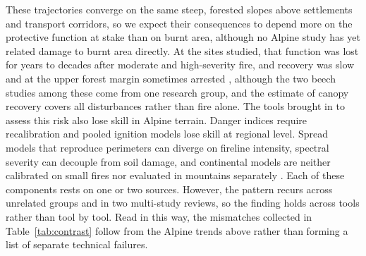 \documentclass[11pt,a4paper]{article}
\begin{document}
These trajectories converge on the same steep, forested slopes above settlements and transport corridors, so we expect their consequences to depend more on the protective function at stake than on burnt area, although no Alpine study has yet related damage to burnt area directly. At the sites studied, that function was lost for years to decades after moderate and high-severity fire, and recovery was slow and at the upper forest margin sometimes arrested \citep{maringer_temporal_2016, gehring_shallow_2019, stritih_alternative_2023, degiuli_arrested_2024, melzner_wildfire-induced_2025}, although the two beech studies among these come from one research group, and the estimate of canopy recovery covers all disturbances rather than fire alone. The tools brought in to assess this risk also lose skill in Alpine terrain. Danger indices require recalibration and pooled ignition models lose skill at regional level. Spread models that reproduce perimeters can diverge on fireline intensity, spectral severity can decouple from soil damage, and continental models are neither calibrated on small fires nor evaluated in mountains separately \citep{de_angelis_modelling_2015, zacharakis_environmental_2023, gelabert_assessing_2025, malanchini_modeling_2025, negri_wildfire_2026, forrest_understanding_2024, hayajneh_wind_2026, or_review_2023}. Each of these components rests on one or two sources. However, the pattern recurs across unrelated groups and in two multi-study reviews, so the finding holds across tools rather than tool by tool. Read in this way, the mismatches collected in Table~\ref{tab:contrast} follow from the Alpine trends above rather than forming a list of separate technical failures.
\end{document}
